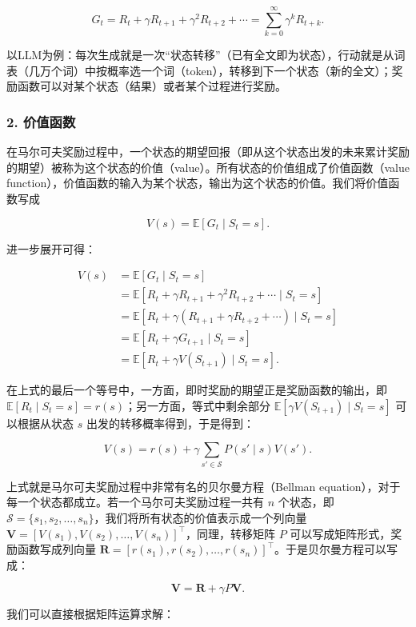 \[
G_t=R_t+\gamma R_{t+1}+\gamma^{2} R_{t+2}+\cdots
=\sum_{k=0}^{\infty}\gamma^{k} R_{t+k}.
\]

以LLM为例：每次生成就是一次``状态转移''（已有全文即为状态），行动就是从词表（几万个词）中按概率选一个词（token），转移到下一个状态（新的全文）；奖励函数可以对某个状态（结果）或者某个过程进行奖励。

\hypertarget{ux4ef7ux503cux51fdux6570}{%
\subsubsection{2. 价值函数}\label{ux4ef7ux503cux51fdux6570}}

在马尔可夫奖励过程中，一个状态的期望回报（即从这个状态出发的未来累计奖励的期望）被称为这个状态的价值（value）。所有状态的价值组成了价值函数（value function），价值函数的输入为某个状态，输出为这个状态的价值。我们将价值函数写成

\[
V(s)=\mathbb{E}[G_t\mid S_t=s].
\]

进一步展开可得：

\[
\begin{aligned}
V(s)
&=\mathbb{E}[G_t\mid S_t=s]\\
&=\mathbb{E}[R_t+\gamma R_{t+1}+\gamma^{2} R_{t+2}+\cdots\mid S_t=s]\\
&=\mathbb{E}[R_t+\gamma(R_{t+1}+\gamma R_{t+2}+\cdots)\mid S_t=s]\\
&=\mathbb{E}[R_t+\gamma G_{t+1}\mid S_t=s]\\
&=\mathbb{E}[R_t+\gamma V(S_{t+1})\mid S_t=s].
\end{aligned}
\]

在上式的最后一个等号中，一方面，即时奖励的期望正是奖励函数的输出，即 \(\mathbb{E}[R_t\mid S_t=s]=r(s)\)；另一方面，等式中剩余部分 \(\mathbb{E}[\gamma V(S_{t+1})\mid S_t=s]\) 可以根据从状态 \(s\) 出发的转移概率得到，于是得到：

\[
V(s)=r(s)+\gamma\sum_{s'\in\mathcal{S}}P(s'\mid s)V(s').
\]

上式就是马尔可夫奖励过程中非常有名的贝尔曼方程（Bellman equation），对于每一个状态都成立。若一个马尔可夫奖励过程一共有 \(n\) 个状态，即 \(\mathcal{S}=\{s_1,s_2,\ldots,s_n\}\)，我们将所有状态的价值表示成一个列向量 \(\mathbf{V}=[V(s_1),V(s_2),\ldots,V(s_n)]^{\top}\)，同理，转移矩阵 \(P\) 可以写成矩阵形式，奖励函数写成列向量 \(\mathbf{R}=[r(s_1),r(s_2),\ldots,r(s_n)]^{\top}\)。于是贝尔曼方程可以写成：

\[
\mathbf{V}=\mathbf{R}+\gamma P\mathbf{V}.
\]

我们可以直接根据矩阵运算求解：

